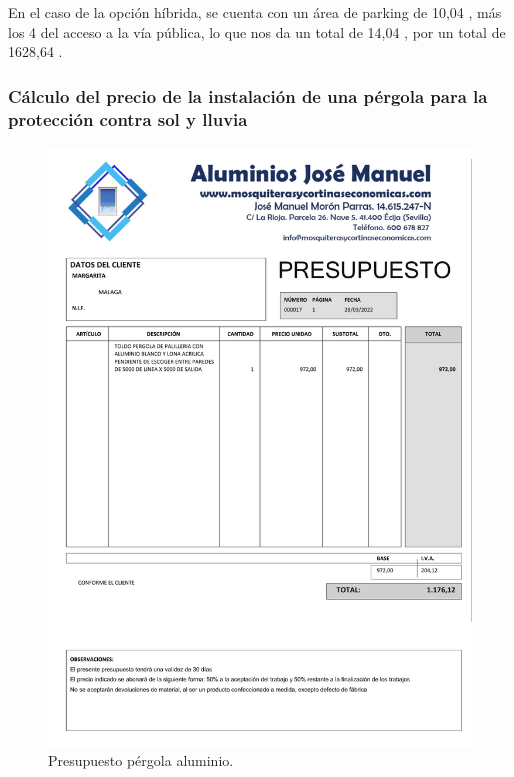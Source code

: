 En el caso de la opción híbrida, se cuenta con un área de parking de 10,04 , más los 4  del acceso a la vía pública, lo que nos da un total de 14,04 , por un total de 1628,64 .

\subsubsection{Cálculo del precio de la instalación de una pérgola para la protección contra sol y lluvia}

\begin{figure}[ht]
    \centering
    \includegraphics[scale = 0.45]{contenido/Anexos/Presupuesto 1-000017.pdf}
    \caption{Presupuesto pérgola aluminio.}
    \label{fig:PresupPA}
\end{figure}

